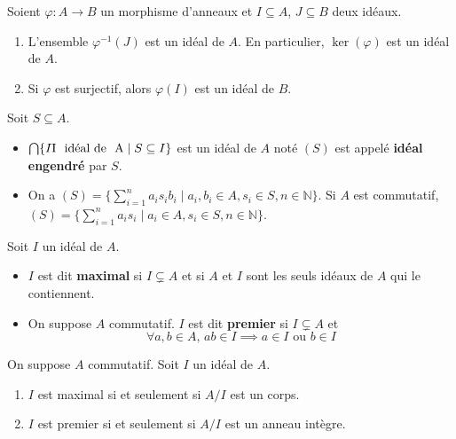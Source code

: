   \begin{proposition}
    Soient $\varphi : A \rightarrow B$ un morphisme d'anneaux et $I \subseteq A$, $J \subseteq B$ deux idéaux.
    \begin{enumerate}[label={\bfseries(\roman*)}]
      \item L'ensemble $\varphi^{-1}(J)$ est un idéal de $A$. En particulier, $\ker(\varphi)$ est un idéal de $A$.
      \item Si $\varphi$ est surjectif, alors $\varphi(I)$ est un idéal de $B$.
    \end{enumerate}
  \end{proposition}

  \begin{definition}
    Soit $S \subseteq A$.
    \begin{itemize}
      \item $\bigcap \{ I \text{I \text{ idéal de } A} \mid S \subseteq I \}$ est un idéal de $A$ noté $(S)$ est appelé \textbf{idéal engendré} par $S$.
      \item On a $(S) = \{ \sum_{i=1}^n a_i s_i b_i \mid a_i, b_i \in A, s_i \in S, n \in \mathbb{N} \}$. Si $A$ est commutatif, $(S) = \{ \sum_{i=1}^n a_i s_i \mid a_i \in A, s_i \in S, n \in \mathbb{N} \}$.
    \end{itemize}
  \end{definition}


  \begin{definition}
    Soit $I$ un idéal de $A$.
    \begin{itemize}
      \item $I$ est dit \textbf{maximal} si $I \subsetneq A$ et si $A$ et $I$ sont les seuls idéaux de $A$ qui le contiennent.
      \item On suppose $A$ commutatif. $I$ est dit \textbf{premier} si $I \subsetneq A$ et
      \[ \forall a, b \in A, \, ab \in I \implies a \in I \text{ ou } b \in I \]
    \end{itemize}
  \end{definition}

  \begin{proposition}
    On suppose $A$ commutatif. Soit $I$ un idéal de $A$.
    \begin{enumerate}[label={\bfseries(\roman*)}]
      \item $I$ est maximal si et seulement si $A/I$ est un corps.
      \item $I$ est premier si et seulement si $A/I$ est un anneau intègre.
    \end{enumerate}
  \end{proposition}

